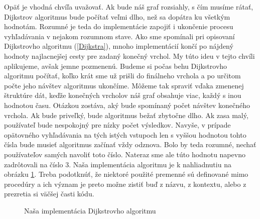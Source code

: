 Opäť je vhodná chvíľa uvažovať. Ak bude náš graf rozsiahly, s čím musíme rátať, Dijkstrov algoritmus bude počítať veľmi dlho, než sa dopátra ku všetkým hodnotám. Rozumné je teda do implementácie zapojiť i ukončenie procesu vyhľadávania v nejakom rozumnom stave. Ako sme spomínali pri opisovaní Dijkstrovho algoritmu (\ref{Dijkstra}), mnoho implementácií končí po nájdený hodnoty najlacnejšej cesty pre zadaný konečný vrchol. My túto ideu v tejto chvíli aplikujeme, avšak jemne pozmenenú. Budeme si počas behu Dijkstrovho algoritmu počítať, koľko krát sme už prišli do finálneho vrchola a po určitom počte jeho návštev algoritmus ukončíme. Môžeme tak spraviť vďaka zmenenej štruktúre dát, keďže konečných vrcholov náš graf obsahuje viac, každý s inou hodnotou času. Otázkou zostáva, aký bude spomínaný počet návštev konečného vrchola. Ak bude priveľký, bude algoritmus bežať zbytočne dlho. Ak zasa malý, používateľ bude nespokojný pre nízky počet výsledkov. Navyše, v prípade opätovného vyhľadávania na tých istých vstupoch len s vyššou hodnotou tohto čísla bude musieť algoritmus začínať vždy odznova. Bolo by teda rozumné, nechať používateľov samých navoliť toto číslo. Nateraz sme ale túto hodnotu napevno zadrôtovali na číslo $3$. Naša implementácia algoritmu je k nahliadnutiu na obrázku \ref{Dijsktra_obr2}. Treba podotknúť, že niektoré použité premenné sú definované mimo procedúry a ich význam je preto možne zistiť buď z názvu, z kontextu, alebo z prezretia si väčšej časti kódu.\newline

\begin{figure}[H]
  \caption{Naša implementácia Dijkstrovho algoritmu}
  \label{Dijsktra_obr2}
\end{figure}

